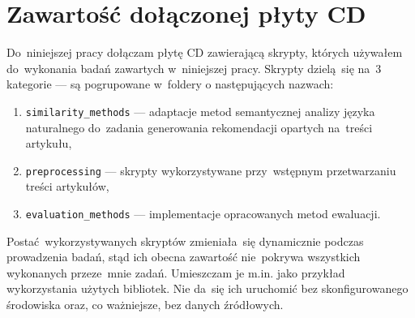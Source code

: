 \documentclass[pl]{minipw} %
\begin{document}
\chapter{Zawartość dołączonej płyty CD}
Do~niniejszej pracy dołączam płytę CD zawierającą skrypty, których używałem do~wykonania badań zawartych w~niniejszej pracy. Skrypty dzielą~się na~3 kategorie --- są pogrupowane w~foldery o następujących nazwach:
\begin{enumerate}
	\item \texttt{similarity\_methods} --- adaptacje metod semantycznej analizy języka naturalnego do~zadania generowania rekomendacji opartych na~treści artykułu,
	\item \texttt{preprocessing} --- skrypty wykorzystywane przy~wstępnym przetwarzaniu treści artykułów,
	\item \texttt{evaluation\_methods} --- implementacje opracowanych metod ewaluacji.
\end{enumerate}
Postać wykorzystywanych skryptów zmieniała~się dynamicznie podczas prowadzenia badań, stąd ich obecna zawartość nie~pokrywa wszystkich wykonanych przeze~mnie zadań. Umieszczam je m.in. jako przykład wykorzystania użytych bibliotek. Nie da~się ich uruchomić bez skonfigurowanego środowiska oraz, co ważniejsze, bez danych źródłowych.
\end{document}
